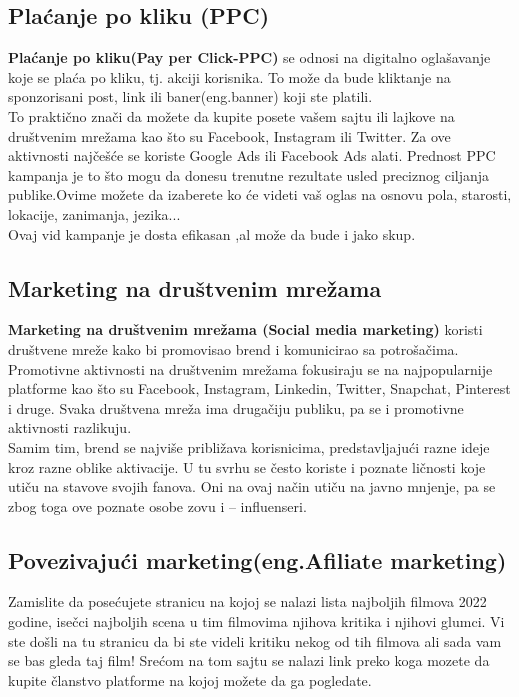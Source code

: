 \documentclass[a4paper]{article}
\begin{document}
{\subsection{Plaćanje po kliku (PPC)}
\label{subsec:PPC}
\textbf{Plaćanje po kliku(Pay per Click-PPC)} se odnosi na digitalno oglašavanje koje se plaća po kliku, tj. akciji korisnika. To može da bude kliktanje na sponzorisani post, link ili baner(eng.banner) koji ste platili.
\\To praktično znači da možete da kupite posete vašem sajtu ili lajkove na društvenim mrežama kao što su Facebook, Instagram ili Twitter. Za ove aktivnosti najčešće se koriste Google Ads ili Facebook Ads alati.
Prednost PPC kampanja je to što mogu da donesu trenutne rezultate usled preciznog ciljanja publike.Ovime možete da izaberete ko će videti vaš oglas na osnovu pola, starosti, lokacije, zanimanja, jezika...
\\Ovaj vid kampanje je dosta efikasan ,al može da bude i jako skup.
\subsection{Marketing na društvenim mrežama}
\label{subsec:Društvene mreže}
\textbf{Marketing na društvenim mrežama (Social media marketing)} koristi društvene mreže kako bi promovisao brend i komunicirao sa potrošačima. Promotivne aktivnosti na društvenim mrežama fokusiraju se na najpopularnije platforme kao što su Facebook, Instagram, Linkedin, Twitter, Snapchat, Pinterest i druge. Svaka društvena mreža ima drugačiju publiku, pa se i promotivne aktivnosti razlikuju.
\\Samim tim, brend se najviše približava korisnicima, predstavljajući razne ideje kroz razne oblike aktivacije. U tu svrhu se često koriste i poznate ličnosti koje utiču na stavove svojih fanova. Oni na ovaj način utiču na javno mnjenje, pa se zbog toga ove poznate osobe zovu i – influenseri.
\subsection{Povezivajući marketing(eng.Afiliate marketing)}
\label{subsec:Povezivajući marketing(Afiliate marketing)}
Zamislite da posećujete stranicu na kojoj se nalazi lista najboljih filmova 2022 godine, isečci najboljih scena u tim filmovima njihova kritika i njihovi glumci. Vi ste došli na tu stranicu da bi ste videli kritiku nekog od tih filmova ali sada vam se bas gleda taj film! Srećom  na tom sajtu se nalazi link preko koga mozete da kupite članstvo platforme na kojoj možete da ga pogledate. 

}
\end{document}
